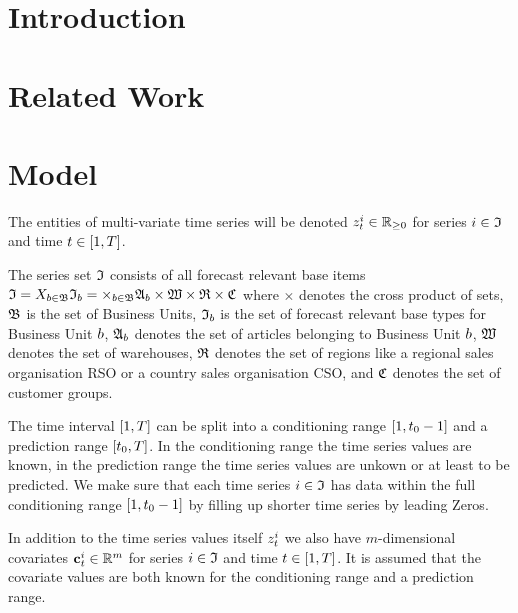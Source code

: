 \documentclass[11pt,headings=small]{scrartcl}
\begin{document}


\begin{abstract} 
	
\end{abstract}

\section{Introduction}
\label{section:Intro}




\section{Related Work}
\label{section:Rel}

\section{Model}
\label{section:Model}

The entities of multi-variate time series will be denoted $z^{i}_{t}\in\mathbb R_{\ge 0}$ for series $i \in \frak{I}$ and time $t \in [1,T]$.
 
The series set $\frak{I}$ consists of all forecast relevant base items 
$\frak{I} = X_{b\in\frak{B}} \frak{I}_{b} = \times_{b\in\frak{B}}\frak{A}_{b} \times \frak{W} \times \frak{R} \times \frak{C}$ where $\times$ denotes the cross product of sets, $\frak{B}$ is the set of Business Units, $\frak{I}_{b}$ is the set of forecast relevant base types for Business Unit $b$, $\frak{A}_{b}$ denotes the set of articles belonging to Business Unit $b$, $\frak{W}$ denotes the set of warehouses, $\frak{R}$ denotes the set of regions like a regional sales organisation RSO or a country sales organisation CSO, and  $\frak{C}$ denotes the set of customer groups.

The time interval $[1,T]$ can be split into a conditioning range $[1,t_{0}-1]$ and a prediction range $[t_{0},T]$. In the conditioning range the time series values are known, in the prediction range the time series values are unkown or at least to be predicted. We make sure that each time series $i \in \frak{I}$ has data within the full conditioning range $[1,t_{0}-1]$ by filling up shorter time series by leading Zeros.

In addition to the time series values itself $z^{i}_{t}$ we also have $m$-dimensional covariates $\textbf{c}^{i}_{t}\in\mathbb{R}^{m}$ for series $i \in \frak{I}$ and time $t \in [1,T]$. It is assumed that the covariate values are both known for the conditioning range and a prediction range.
\end{document}
